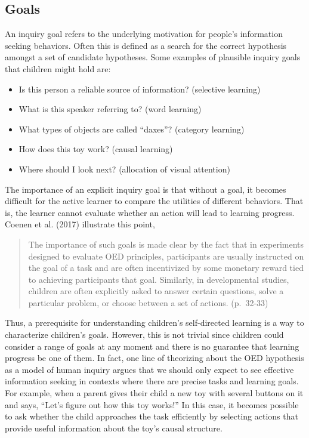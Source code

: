 \documentclass[oneside]{report}
\begin{document}
\hypertarget{goals}{%
\subsection{Goals}\label{goals}}

An inquiry goal refers to the underlying motivation for people's
information seeking behaviors. Often this is defined as a search for the
correct hypothesis amongst a set of candidate hypotheses. Some examples
of plausible inquiry goals that children might hold are:
\begin{itemize}
\tightlist
\item
  Is this person a reliable source of information? (selective learning)
\item
  What is this speaker referring to? (word learning)
\item
  What types of objects are called ``daxes''? (category learning)
\item
  How does this toy work? (causal learning)
\item
  Where should I look next? (allocation of visual attention)
\end{itemize}
\noindent The importance of an explicit inquiry goal is that without a
goal, it becomes difficult for the active learner to compare the
utilities of different behaviors. That is, the learner cannot evaluate
whether an action will lead to learning progress. Coenen et al. (2017)
illustrate this point,
\begin{quote}
The importance of such goals is made clear by the fact that in
experiments designed to evaluate OED principles, participants are
usually instructed on the goal of a task and are often incentivized by
some monetary reward tied to achieving participants that goal.
Similarly, in developmental studies, children are often explicitly asked
to answer certain questions, solve a particular problem, or choose
between a set of actions. (p.~32-33)
\end{quote}
\noindent Thus, a prerequisite for understanding children's
self-directed learning is a way to characterize children's goals.
However, this is not trivial since children could consider a range of
goals at any moment and there is no guarantee that learning progress be
one of them. In fact, one line of theorizing about the OED hypothesis as
a model of human inquiry argues that we should only expect to see
effective information seeking in contexts where there are precise tasks
and learning goals. For example, when a parent gives their child a new
toy with several buttons on it and says, ``Let's figure out how this toy
works!'' In this case, it becomes possible to ask whether the child
approaches the task efficiently by selecting actions that provide useful
information about the toy's causal structure.
\end{document}
